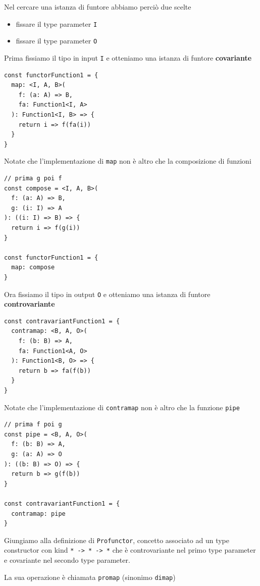 \documentclass[12pt]{article}
\begin{document}
Nel cercare una istanza di funtore abbiamo perciò due scelte

\begin{itemize}
\item fissare il type parameter \texttt{I}
\item fissare il type parameter \texttt{O}
\end{itemize}

Prima fissiamo il tipo in input \texttt{I} e otteniamo una istanza di funtore \textbf{covariante}

\begin{verbatim}
const functorFunction1 = {
  map: <I, A, B>(
    f: (a: A) => B,
    fa: Function1<I, A>
  ): Function1<I, B> => {
    return i => f(fa(i))
  }
}
\end{verbatim}

Notate che l'implementazione di \texttt{map} non è altro che la composizione di funzioni

\begin{verbatim}
// prima g poi f
const compose = <I, A, B>(
  f: (a: A) => B,
  g: (i: I) => A
): ((i: I) => B) => {
  return i => f(g(i))
}

const functorFunction1 = {
  map: compose
}
\end{verbatim}

Ora fissiamo il tipo in output \texttt{O} e otteniamo una istanza di funtore \textbf{controvariante}

\begin{verbatim}
const contravariantFunction1 = {
  contramap: <B, A, O>(
    f: (b: B) => A,
    fa: Function1<A, O>
  ): Function1<B, O> => {
    return b => fa(f(b))
  }
}
\end{verbatim}

Notate che l'implementazione di \texttt{contramap} non è altro che la funzione \texttt{pipe}

\begin{verbatim}
// prima f poi g
const pipe = <B, A, O>(
  f: (b: B) => A,
  g: (a: A) => O
): ((b: B) => O) => {
  return b => g(f(b))
}

const contravariantFunction1 = {
  contramap: pipe
}
\end{verbatim}

Giungiamo alla definizione di \texttt{Profunctor}, concetto associato ad un type constructor con kind \texttt{* -> * -> *} che è
controvariante nel primo type parameter e covariante nel secondo type parameter.

La sua operazione è chiamata \texttt{promap} (sinonimo \texttt{dimap})
\end{document}
